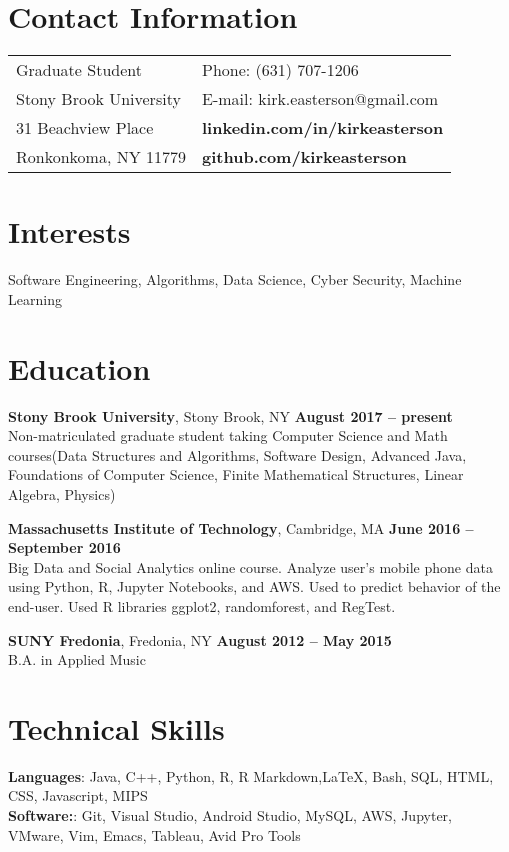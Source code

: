 \documentclass[margin,line]{res}
\begin{document}

\begin{resume}
\section{\sc Contact Information}

\vspace{.05in}
\begin{tabular}{@{}p{3.5in}p{3in}}
Graduate Student      & {Phone:}  (631) 707-1206\\
Stony Brook University & {E-mail:}  kirk.easterson@gmail.com\\
31 Beachview Place & {\bf linkedin.com/in/kirkeasterson}\\
Ronkonkoma, NY 11779 & {\bf github.com/kirkeasterson}
\end{tabular}

\section{\sc Interests}

Software Engineering, Algorithms, Data Science, Cyber Security, Machine Learning

\section{\sc Education}
{\bf Stony Brook University}, Stony Brook, NY \hfill {\bf August 2017 -- present}\\
Non-matriculated graduate student taking Computer Science and Math courses(Data Structures and Algorithms, Software Design, Advanced Java, Foundations of Computer Science, Finite Mathematical Structures, Linear Algebra, Physics)

{\bf Massachusetts Institute of Technology}, Cambridge, MA \hfill {\bf June 2016 -- September 2016}\\
Big Data and Social Analytics online course. Analyze user's mobile phone data using Python, R, Jupyter Notebooks, and AWS. Used to predict behavior of the end-user. Used R libraries ggplot2, randomforest, and RegTest.

{\bf SUNY Fredonia}, Fredonia, NY \hfill {\bf August 2012 -- May 2015}\\
B.A. in Applied Music

\section{\sc Technical Skills}
{\bf Languages}:  Java, C++, Python, R, R Markdown,{\LaTeX}, Bash, SQL, HTML, CSS, Javascript, MIPS\\
{\bf Software:}: Git, Visual Studio, Android Studio, MySQL, AWS, Jupyter, VMware, Vim, Emacs, Tableau, Avid Pro Tools


\end{resume}
\end{document}
